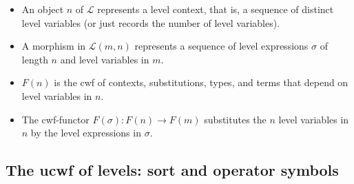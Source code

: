 \documentclass[11pt,a4paper]{article}
\theoremstyle{definition}
\newcommand{\UU}{\mathsf{U}}
\def\UU{\mathsf{U}}
\def\L{{\mathcal{L}}}
\def\CwF{\mathrm{CwF}}
\begin{document}
\begin{itemize}
\item 
An object $n$ of $\L$ represents a level context, that is, a sequence of distinct level variables (or just records the number of level variables). 
\item
A morphism in $\L(m,n)$ represents a sequence of level expressions $\sigma$ of length $n$ and level variables in $m$.
\item
$F(n)$ is the cwf of contexts, substitutions, types, and terms that depend on level variables in $n$.
\item
The cwf-functor $F(\sigma) : F(n) \to F(m)$ substitutes the $n$ level variables in $n$ by the level expressions in $\sigma$. 
\end{itemize}



\subsection{The ucwf of levels: sort and operator symbols}
\end{document}
